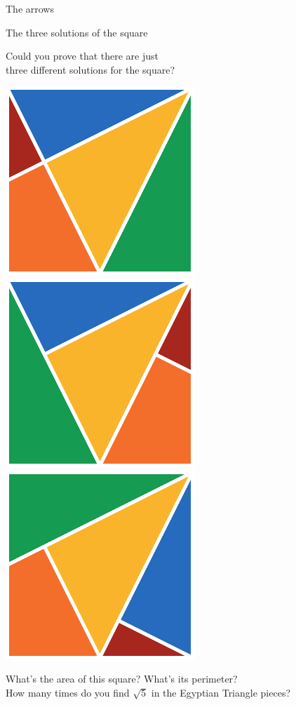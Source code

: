 \documentclass[14pt]{beamer}
\begin{document}
\begin{frame}{The arrows}
   \end{frame}


    \begin{frame}{The three solutions of the square}

        \vspace{-1em}
        \begin{center}
            Could you prove that there are just\\three different solutions for the square?

            \bigskip\bigskip

            \includegraphics[height=12ex]{figures/figure021a.pdf}\quad\includegraphics[height=12ex]{figures/figure021b.pdf}\quad\includegraphics[height=12ex]{figures/figure021c.pdf} \\

            \bigskip\bigskip

            {\footnotesize What's the area of this square? What's its perimeter?\\How many times do you find $\sqrt{5}$ in the Egyptian Triangle pieces?}
        \end{center}
    \end{frame}
\end{document}
